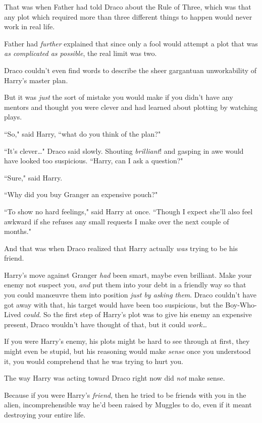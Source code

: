 That was when Father had told Draco about the Rule of Three, which was that any plot which required more than three different things to happen would never work in real life.

Father had \emph{further} explained that since only a fool would attempt a plot that was \emph{as complicated as possible}, the real limit was two.

Draco couldn't even find words to describe the sheer gargantuan unworkability of Harry's master plan.

But it was \emph{just} the sort of mistake you would make if you didn't have any mentors and thought you were clever and had learned about plotting by watching plays.

``So," said Harry, ``what do you think of the plan?"

``It's clever{\ldots}" Draco said slowly. Shouting \emph{brilliant}! and gasping in awe would have looked too suspicious. ``Harry, can I ask a question?"

``Sure," said Harry.

``Why did you buy Granger an expensive pouch?"

``To show no hard feelings," said Harry at once. ``Though I expect she'll also feel awkward if she refuses any small requests I make over the next couple of months."

And that was when Draco realized that Harry actually \emph{was} trying to be his friend.

Harry's move against Granger \emph{had} been smart, maybe even brilliant. Make your enemy not suspect you, \emph{and} put them into your debt in a friendly way so that you could manœuvre them into position \emph{just by asking them}. Draco couldn't have got away with that, his target would have been too suspicious, but the Boy-Who-Lived \emph{could}. So the first step of Harry's plot was to give his enemy an expensive present, Draco wouldn't have thought of that, but it could \emph{work{\ldots}}

If you were Harry's enemy, his plots might be hard to see through at first, they might even be stupid, but his reasoning would make \emph{sense} once you understood it, you would comprehend that he was trying to hurt you.

The way Harry was acting toward Draco right now did \emph{not} make sense.

Because if you were Harry's \emph{friend}, then he tried to be friends with you in the alien, incomprehensible way he'd been raised by Muggles to do, even if it meant destroying your entire life.

